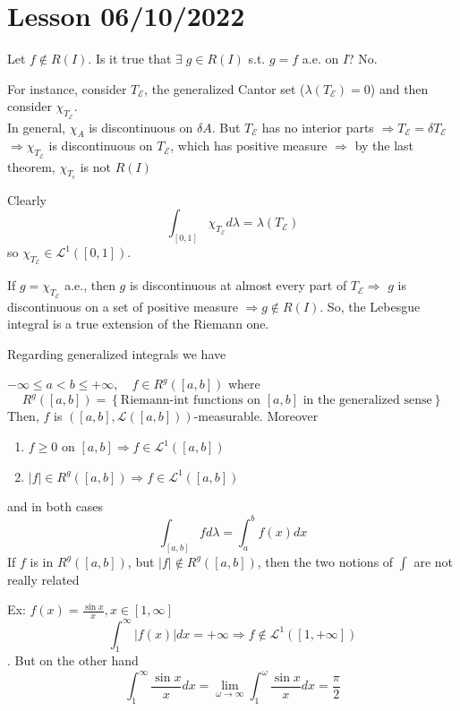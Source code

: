 \section{Lesson 06/10/2022}
Let \(f \not \in R(I)\). Is it true that \(\exists \; g \in R(I)\) s.t. \(g = f\) a.e. on \(I\)? No.

For instance, consider \(T_{\mathcal{E}}\), the generalized Cantor set (\(\lambda(T_{\mathcal{E}}) = 0\)) and then consider \(\chi_{T_{\mathcal{E}}}\). \\
In general, \(\chi_{A}\) is discontinuous on \(\delta A\).  But \(T_{\mathcal{E}}\) has no interior parts \(\Longrightarrow T_{\mathcal{E}} = \delta T_{\mathcal{E}}\) \(\Longrightarrow \chi_{T_{\mathcal{E}}}\) is discontinuous on \(T_{\mathcal{E}}\), which has positive measure
\(\Rightarrow \) by the last theorem, \(\chi_{T_\epsilon}\) is not \(R(I)\)

Clearly 
\[
    \int_{[0,1]} \chi_{T_{\mathcal{E}}} d\lambda = \lambda(T_{\mathcal{E}})
\]
so \(\chi_{T_{\mathcal{E}}} \in \mathcal{L}^1([0,1])\).  

If \(g = \chi_{T_{\mathcal{E}}}\) a.e., then \(g\) is discontinuous at almost every part of \(T_{\mathcal{E}} \Longrightarrow\) \(g\) is discontinuous on a set of positive measure \(\Longrightarrow g \not \in R(I)\). 
So, the Lebesgue integral is a true extension of the Riemann one.

Regarding generalized integrals we have

\begin{theorem}
    \(-\infty \leq a < b \leq +\infty, \quad f \in R^g([a,b])\) where 
    \[
        R^g([a,b]) = \left\lbrace \mbox{Riemann-int functions on }[a,b]\mbox{ in the generalized sense} \right\rbrace
    \]
    Then, \(f\) is \(([a,b], \mathcal{L}([a,b]))\)-measurable. Moreover
    \begin{enumerate}
        \item \(f \geq 0\) on \([a,b] \Longrightarrow f \in \mathcal{L}^1([a,b])\)
        \item \(\vert f \vert \in R^g([a,b]) \Longrightarrow f \in \mathcal{L}^1 ([a,b])\)
    \end{enumerate}
    and in both cases
    \[
        \int_{[a,b]} fd\lambda = \int_a^b f(x)dx
    \]
    If \(f\) is in \(R^g([a,b])\), but \(\vert f\vert \not \in R^g([a,b])\), then the two notions of \(\int\) are not really related
\end{theorem}

Ex:
\(f(x) = \frac{\sin x}{x},  x \in [1, \infty]\)
\[\int_1^{\infty} \vert f(x) \vert dx = +\infty \Longrightarrow f \not \in \mathcal{L}^1([1, +\infty])\].
But on the other hand
\[
    \int_1^{\infty} \frac{\sin x}{x} dx = \lim_{\omega \to \infty} \int_1^{\omega} \frac{\sin x}{x} dx = \frac{\pi}{2}
\]

